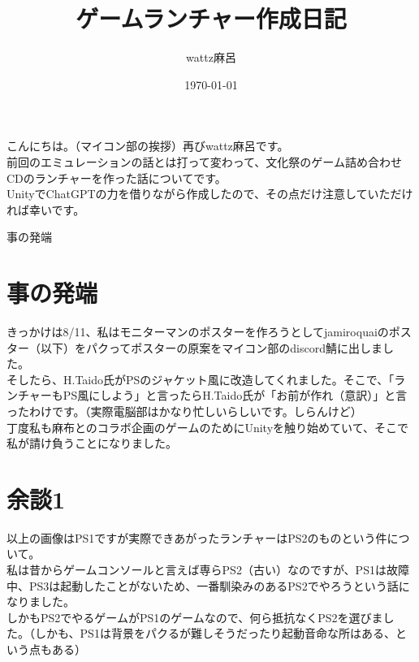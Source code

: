 \documentclass[b5paper,11pt]{jsarticle}
\begin{document}
\title{ゲームランチャー作成日記}
\author{wattz麻呂}
\date{\today}
\maketitle
\thispagestyle{empty}

\begin{multicols*}{3}
  
こんにちは。（マイコン部の挨拶）再びwattz麻呂です。\\
前回のエミュレーションの話とは打って変わって、文化祭のゲーム詰め合わせCDのランチャーを作った話についてです。\\
UnityでChatGPTの力を借りながら作成したので、その点だけ注意していただければ幸いです。\\
\begin{index}{1}
事の発端
\end{index}
\section{事の発端}
きっかけは8/11、私はモニターマンのポスターを作ろうとしてjamiroquaiのポスター（以下）をパクってポスターの原案をマイコン部のdiscord鯖に出しました。\\
そしたら、H.Taido氏がPSのジャケット風に改造してくれました。そこで、「ランチャーもPS風にしよう」と言ったらH.Taido氏が「お前が作れ（意訳）」と言ったわけです。（実際電脳部はかなり忙しいらしいです。しらんけど）\\
丁度私も麻布とのコラボ企画のゲームのためにUnityを触り始めていて、そこで私が請け負うことになりました。\\
\section{余談1}
以上の画像はPS1ですが実際できあがったランチャーはPS2のものという件について。\\
私は昔からゲームコンソールと言えば専らPS2（古い）なのですが、PS1は故障中、PS3は起動したことがないため、一番馴染みのあるPS2でやろうという話になりました。\\
しかもPS2でやるゲームがPS1のゲームなので、何ら抵抗なくPS2を選びました。（しかも、PS1は背景をパクるが難しそうだったり起動音命な所はある、という点もある）\\

\end{multicols*}
\end{document}
